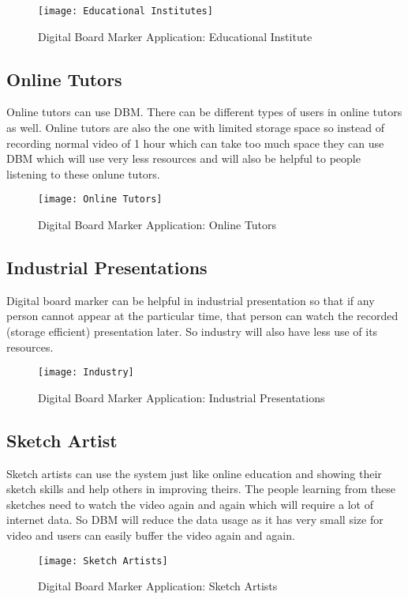 \begin{figure}[h]
  \centering
  \texttt{[image: Educational Institutes]}
  \caption{Digital Board Marker Application: Educational Institute}
\end{figure}
\bigskip


\subsection{Online Tutors}
Online tutors can use DBM. There can be different types of users in online tutors as well. Online tutors are also the one with limited storage space so instead of recording normal video of 1 hour which can take too much space they can use DBM which will use very less resources and will also be helpful to people listening to these onlune tutors.

\bigskip

\begin{figure}[h]
  \centering
  \texttt{[image: Online Tutors]}
  \caption{Digital Board Marker Application: Online Tutors}
\end{figure}

\bigskip

\subsection{Industrial Presentations}
Digital board marker can be helpful in industrial presentation so that if any person cannot appear at the particular time, that person can watch the recorded (storage efficient) presentation later. So industry will also have less use of its resources.

\begin{figure}[h]
  \centering
  \texttt{[image: Industry]}
  \caption{Digital Board Marker Application: Industrial Presentations}
\end{figure}

\subsection{Sketch Artist}
Sketch artists can use the system just like online education and showing their sketch skills and help others in improving theirs. The people learning from these sketches need to watch the video again and again which will require a lot of internet data. So DBM will reduce the data usage as it has very small size for video and users can easily buffer the video again and again.
\bigskip

\begin{figure}[h]
  \centering
  \texttt{[image: Sketch Artists]}
  \caption{Digital Board Marker Application: Sketch Artists}
\end{figure}

\bigskip















